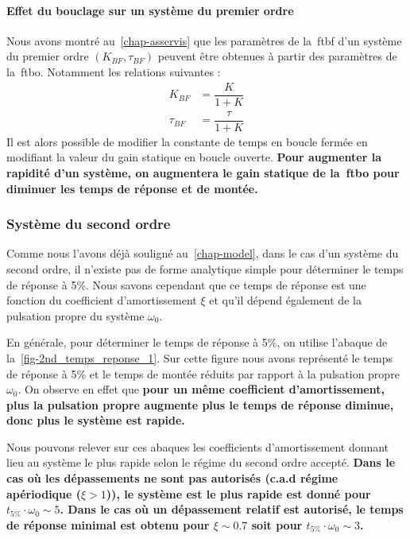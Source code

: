 \paragraph{Effet du bouclage sur un système du premier ordre}
Nous avons montré au~\cref{chap-asservis} que les paramètres de 
la~\gls{ftbf} d'un système du premier ordre $(K_{BF},\tau_{BF})$ peuvent 
être obtenues à partir des paramètres de la~\gls{ftbo}. Notamment les relations
suivantes :
\begin{align*}
       K_{BF}&=\dfrac{K}{1+K}\\
    \tau_{BF}&=\dfrac{\tau}{1+K}
\end{align*}
Il est alors possible de modifier la constante de temps en boucle fermée en 
modifiant la valeur du gain statique en boucle ouverte. \textbf{Pour augmenter
la rapidité d'un système, on augmentera le gain statique de la~\gls{ftbo} pour
diminuer les temps de réponse et de montée.}
\subsubsection{Système du second ordre}
Comme nous l'avons déjà souligné au~\cref{chap-model}, dans le cas d'un système
du second ordre, il n'existe pas de forme analytique simple pour déterminer 
le temps de réponse à 5\%. Nous savons cependant que ce temps de réponse est 
une fonction du coefficient d'amortissement $\xi$ et qu'il dépend également 
de la pulsation propre du système $\omega_0$.

En générale, pour déterminer le temps de réponse à 5\%, on utilise l'abaque de 
la~\cref{fig-2nd_temps_reponse_1}. Sur cette figure nous avons représenté
le temps de réponse à 5\% et le temps de montée réduits par rapport à la
pulsation propre $\omega_0$. On observe en effet que \textbf{pour un même 
coefficient d'amortissement, plus la pulsation propre augmente plus 
le temps de réponse diminue, donc plus le système est rapide.}

Nous pouvons relever sur ces abaques les coefficients d'amortissement donnant
lieu au système le plus rapide selon le régime du second ordre accepté.
\textbf{Dans le cas où les dépassements ne sont pas autorisés (c.a.d régime 
apériodique ($\xi>1$)), le système est le plus rapide est donné pour 
$t_{5\%}\cdot\omega_0\sim5$. Dans le cas où un dépassement relatif est 
autorisé, le temps de réponse minimal est obtenu pour $\xi\sim 0.7$ soit
pour $t_{5\%}\cdot\omega_0\sim3$.}

